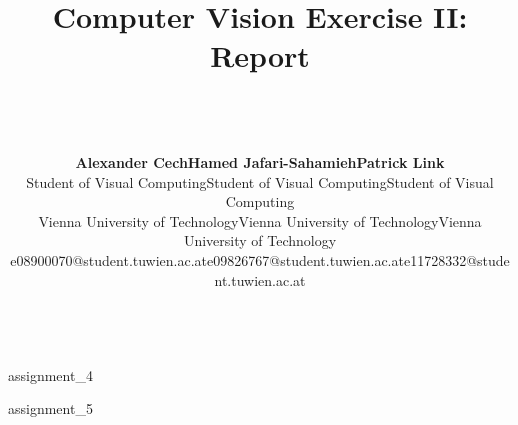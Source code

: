 \documentclass[a4paper,psfig,subfigure,epsfig,ausarbeitung,amssmb,float,caption,fontenc]{article}
\begin{document}
\date{}

\title{%
  \fontsize{14}{14pt} \bf Computer Vision Exercise II: Report}

\author{~\\
  ~\\
  \fontsize{12}{12pt}
  \begin{tabular}[t]{c c c}
  {\bf Alexander Cech}                    & {\bf Hamed Jafari-Sahamieh}             & {\bf Patrick Link}                      \\
  \small{Student of Visual Computing}     & \small{Student of Visual Computing}     & \small{Student of Visual Computing}     \\
  \small{Vienna University of Technology} & \small{Vienna University of Technology} & \small{Vienna University of Technology} \\
  \small{e08900070@student.tuwien.ac.at}  & \small{e09826767@student.tuwien.ac.at}  & \small{e11728332@student.tuwien.ac.at}  \\
  \end{tabular}
  ~\\ 
  \normalsize
  \normalsize
  }

\maketitle

\normalfont
\thispagestyle{empty}

%
%


 {assignment_4}
\FloatBarrier %

 {assignment_5}
\FloatBarrier %
\end{document}
